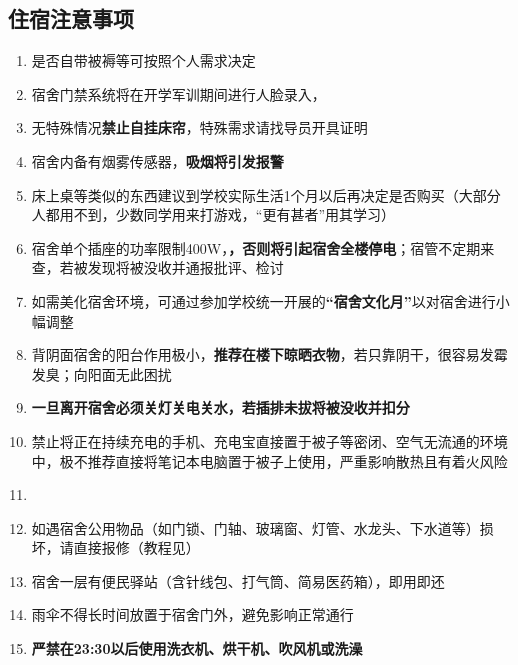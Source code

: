\subsection[住宿注意事项]{住宿注意事项}
\begin{enumerate}
    \item 是否自带被褥等可按照个人需求决定\footnotemark
    \item 宿舍门禁系统将在开学军训期间进行人脸录入，\textbf{}
    \item 无特殊情况\textbf{禁止自挂床帘}，特殊需求请找导员开具证明
    \item 宿舍内备有烟雾传感器，\textbf{吸烟将引发报警\footnotemark}
    \item 床上桌等类似的东西建议到学校实际生活1个月以后再决定是否购买（大部分人都用不到，少数同学用来打游戏，“更有甚者”用其学习）
    \item 宿舍单个插座的功率限制400W\footnotemark，\textbf{，否则将引起宿舍全楼停电}；宿管不定期来查，若被发现将被没收并通报批评、检讨
    \item 如需美化宿舍环境，可通过参加学校统一开展的\textbf{“宿舍文化月”}\footnotemark 以对宿舍进行小幅调整
    \item 背阴面宿舍的阳台作用极小，\textbf{推荐在楼下晾晒衣物}，若只靠阴干，很容易发霉发臭；向阳面无此困扰
    \item \textbf{一旦离开宿舍必须关灯关电关水，若插排未拔将被没收并扣分}
    \item 禁止将正在持续充电的手机、充电宝直接置于被子等密闭、空气无流通的环境中，极不推荐直接将笔记本电脑置于被子上使用，严重影响散热且有着火风险
    \item \textbf{}\footnotemark
    \item 如遇宿舍公用物品（如门锁、门轴、玻璃窗、灯管、水龙头、下水道等）损坏，请直接报修（教程见）
    \item 宿舍一层有便民驿站（含针线包、打气筒、简易医药箱），即用即还
    \item 雨伞不得长时间放置于宿舍门外，避免影响正常通行
    \item \textbf{严禁在23:30以后使用洗衣机、烘干机、吹风机或洗澡}
\end{enumerate}

